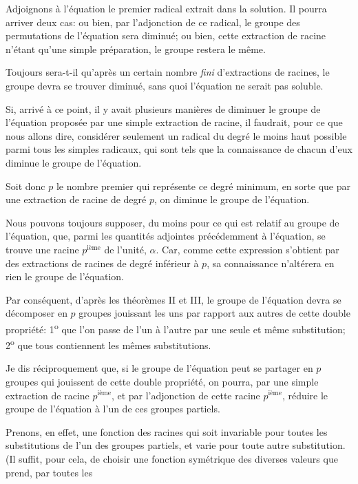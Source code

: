 
Adjoignons à l'équation le premier radical extrait dans la solution.
Il pourra arriver deux cas: ou bien, par l'adjonction de ce
radical, le groupe des permutations de l'équation sera diminué; ou
bien, cette extraction de racine n'étant qu'une simple préparation,
le groupe restera le même.

Toujours sera-t-il qu'après un certain nombre \emph{fini} d'extractions
de racines, le groupe devra se trouver diminué, sans quoi l'équation
ne serait pas soluble.

Si, arrivé à ce point, il y avait plusieurs manières de diminuer le
groupe de l'équation proposée par une simple extraction de racine,
il faudrait, pour ce que nous allons dire, considérer seulement un
radical du degré le moins haut possible parmi tous les simples
radicaux, qui sont tels que la connaissance de chacun d'eux
diminue le groupe de l'équation.

Soit donc $p$ le nombre premier qui représente ce degré minimum,
en sorte que par une extraction de racine de degré $p$, on
diminue le groupe de l'équation.

Nous pouvons toujours supposer, du moins pour ce qui est
relatif au groupe de l'équation, que, parmi les quantités adjointes
précédemment à l'équation, se trouve une racine $p^{\text{ième}}$ de l'unité, $\alpha$.
Car, comme cette expression s'obtient par des extractions de
racines de degré inférieur à $p$, sa connaissance n'altérera en rien
le groupe de l'équation.

Par conséquent, d'après les théorèmes II et III, le groupe de
l'équation devra se décomposer en $p$ groupes jouissant les uns par
rapport aux autres de cette double propriété: 1\textsuperscript{o} que l'on passe
de l'un à l'autre par une seule et même substitution; 2\textsuperscript{o} que tous
contiennent les mêmes substitutions.

Je dis réciproquement que, si le groupe de l'équation peut se
partager en $p$ groupes qui jouissent de cette double propriété, on
pourra, par une simple extraction de racine $p^{\text{ième}}$, et par l'adjonction
de cette racine $p^{\text{ième}}$, réduire le groupe de l'équation à l'un de
ces groupes partiels.

Prenons, en effet, une fonction des racines qui soit invariable
pour toutes les substitutions de l'un des groupes partiels, et varie
pour toute autre substitution. (Il suffit, pour cela, de choisir une
fonction symétrique des diverses valeurs que prend, par toutes les
